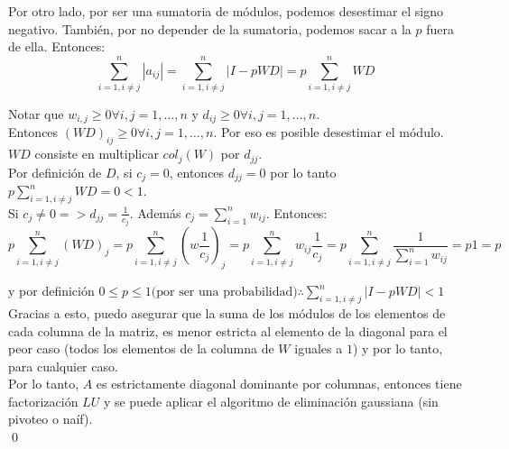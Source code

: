 		Por otro lado, por ser una sumatoria de módulos, podemos desestimar el signo negativo. También, por no depender de la sumatoria, podemos sacar a la $p$ fuera de ella. Entonces: \\

		\begin{equation}
			\sum_{i=1, i \neq j}^{n} |a_{ij}| = \sum_{i=1, i \neq j}^{n} |I-pWD| = p \sum_{i=1, i \neq j}^{n} WD
		\end{equation}

		Notar que $w_{i,j} \geq 0 \forall i,j = 1, \hdots, n$ y $d_{ij} \geq 0 \forall i,j = 1, \hdots, n$. \\

		Entonces $(WD)_{ij} \geq 0 \forall i,j = 1, \hdots, n$. Por eso es posible desestimar el módulo. \\

		$WD$ consiste en multiplicar $col_{j}(W)$ por $d_{jj}$. \\

		Por definición de $D$, si $c_{j} = 0$, entonces $d_{jj} = 0$ por lo tanto $p \sum_{i=1, i \neq j}^{n} WD = 0 < 1$. \\

		Si $c_{j} \neq 0 => d_{jj} = \frac{1}{c_{j}}$. Además $c_{j} = \sum_{i=1}^{n} w_{ij}$. Entonces:\\

		\begin{equation}
			p \sum_{i=1, i \neq j}^{n} (WD)_{j} = p \sum_{i=1, i \neq j}^{n} (w \frac{1}{c_{j}})_{j} =
			p \sum_{i=1, i \neq j}^{n} w_{ij} \frac{1}{c_j} = p \sum_{i=1, i \neq j}^{n} \frac{1}{\sum_{i=1}^{n} w_{ij}} =
			p 1 = p
		\end{equation}

		y por definición $0 \leq p \leq 1 \text{(por ser una probabilidad)} \therefore \sum_{i=1, i \neq j}^{n} |I-pWD| < 1$ \\

		Gracias a esto, puedo asegurar que la suma de los módulos de los elementos de cada columna de la matriz, es menor estricta al elemento de la diagonal para el peor caso (todos los elementos de la columna de $W$ iguales a $1$) y por lo tanto, para cualquier caso. \\

		Por lo tanto, $A$ es estrictamente diagonal dominante por columnas, entonces tiene factorización $LU$ y se puede aplicar el algoritmo de eliminación gaussiana (sin pivoteo o naíf). \\

		\qed

	\clearpage

